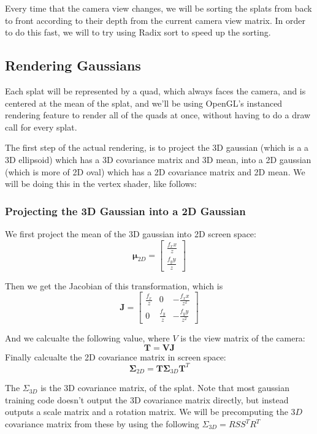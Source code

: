 \documentclass {article}
\begin{document}
     Every time that the camera view changes, we will be sorting the splats from back to front according to their depth from the current camera view matrix. In order to do this fast, we will to try using Radix sort to speed up the sorting.

     \subsection{Rendering Gaussians}

     Each splat will be represented by a quad, which always faces the camera, and is centered at the mean of the splat, and we'll be using OpenGL's instanced rendering feature to render all of the quads at once, without having to do a draw call for every splat.

     The first step of the actual rendering, is to project the 3D gaussian (which is a a 3D ellipsoid) which has a 3D covariance matrix and 3D mean, into a 2D gaussian (which is more of 2D oval) which has a 2D covariance matrix and 2D mean. We will be doing this in the vertex shader, like follows:

     \subsubsection{Projecting the 3D Gaussian into a 2D Gaussian}

     We first project the mean of the 3D gaussian into 2D screen space:
     $$\mathbf{\mu}_{2D} = \begin{bmatrix} 
          \frac{f_x x}{z} \\
          \frac{f_y y}{z}
          \end{bmatrix}$$

     Then we get the Jacobian of this transformation, which is 
     $$
     \mathbf{J} = \begin{bmatrix}
          \frac{f_x}{z} & 0 & -\frac{f_x x}{z^2} \\
          0 & \frac{f_y}{z} & -\frac{f_y y}{z^2}
          \end{bmatrix}
     $$

     And we calcualte the following value, where $V$ is the view matrix of the camera:
     $$\mathbf{T} = \mathbf{V}\mathbf{J}$$
     Finally calcualte the 2D covariance matrix in screen space:
     $$ \boldsymbol{\Sigma}_{2D} = \mathbf{T}\boldsymbol{\Sigma}_{3D}\mathbf{T}^T$$ 
     
     The $\Sigma_{3D}$ is the 3D covariance matrix, of the splat. Note that most gaussian training code doesn't output the 3D covariance matrix directly, but instead outputs a scale matrix and a rotation matrix. We will be precomputing the $3D$ covariance matrix from these by using the following $\Sigma_{3D} = RSS^TR^T$
\end{document}
